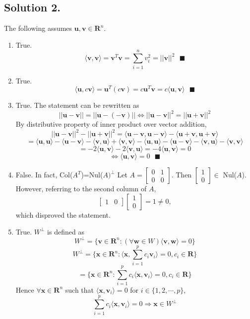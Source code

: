 \documentclass{article}
\begin{document}
\subsection*{Solution 2.}
The following assumes $\mathbf{u},\mathbf{v}\in\mathbf{R}^n$.
\begin{enumerate} [label=(\arabic*)]
    \item True.
    \[\langle \mathbf{v},\mathbf{v}\rangle=\mathbf{v}^T\mathbf{v}=\sum_{i=1}^n v_i^2=||\mathbf{v}||^2\text{      }\blacksquare\]
    \item True.
    \[\langle\mathbf{u},c\mathbf{v}\rangle=\mathbf{u}^T(c\mathbf{v})=c\mathbf{u}^T\mathbf{v}=c\langle\mathbf{u},\mathbf{v}\rangle \text{      }\blacksquare\]
    \item True. The statement can be rewritten as
    \[||\mathbf{u}-\mathbf{v}||=||\mathbf{u}-(-\mathbf{v})||
    \Leftrightarrow ||\mathbf{u}-\mathbf{v}||^2=||\mathbf{u}+\mathbf{v}||^2\]
    By distributive property of inner product over vector addition,
    \[||\mathbf{u}-\mathbf{v}||^2-||\mathbf{u}+\mathbf{v}||^2
    =\langle \mathbf{u}-\mathbf{v},\mathbf{u}-\mathbf{v}\rangle-\langle \mathbf{u}+\mathbf{v},\mathbf{u}+\mathbf{v}\rangle
    \]
    \[=\langle \mathbf{u},\mathbf{u}\rangle-\langle\mathbf{u}-\mathbf{v}\rangle-\langle \mathbf{v},\mathbf{u}\rangle+\langle\mathbf{v},\mathbf{v}\rangle-\langle \mathbf{u},\mathbf{u}\rangle-\langle\mathbf{u}-\mathbf{v}\rangle-\langle \mathbf{v},\mathbf{u}\rangle-\langle\mathbf{v},\mathbf{v}\rangle\]
    \[=-2\langle \mathbf{u},\mathbf{v}\rangle-2\langle \mathbf{v},\mathbf{u}\rangle
    =-4\langle \mathbf{u},\mathbf{v}\rangle=0
    \]
    \[\Leftrightarrow \langle \mathbf{u},\mathbf{v}\rangle=0\text{      }\blacksquare\]
    \item False.
    In fact, Col($A^T$)=Nul($A)^\perp$
    Let $A=\left[\begin{array}{rr}
    0 & 1 \\
    0 & 0
    \end{array}\right]$. Then $\left[\begin{array}{r} 1 \\ 0 \end{array}\right]\in$ Nul($A$).
    However, referring to the second column of $A$,
    \[\left[\begin{array}{rr} 1 &0\end{array}\right]\left[\begin{array}{r} 1 \\ 0 \end{array}\right]=1\neq 0,\]
    which disproved the statement.
    \item True. $W^\perp$ is defined as
\[W^\perp =\{\mathbf{v}\in\mathbf{R}^n:(\forall \mathbf{w}\in W) \langle \mathbf{v},\mathbf{w}\rangle=0\}\]
    \[W^\perp =\{\mathbf{x}\in\mathbf{R}^n: \langle \mathbf{x},\sum_{i=1}^p c_i\mathbf{v}_i\rangle=0,c_i\in\mathbf{R}\}\]
    \[=\{\mathbf{x}\in\mathbf{R}^n: \sum_{i=1}^p c_i\langle \mathbf{x},\mathbf{v}_i\rangle=0,c_i\in\mathbf{R}\}\]
    Hence $\forall\mathbf{x}\in\mathbf{R}^n$ such that $\langle\mathbf{x},\mathbf{v}_i\rangle=0$ for $i\in\{1,2,\cdots,p\}$, 
    \[\sum_{i=1}^p c_i\langle \mathbf{x},\mathbf{v}_i\rangle=0\Rightarrow \mathbf{x}\in W^\perp\]
\end{enumerate}
\end{document}
